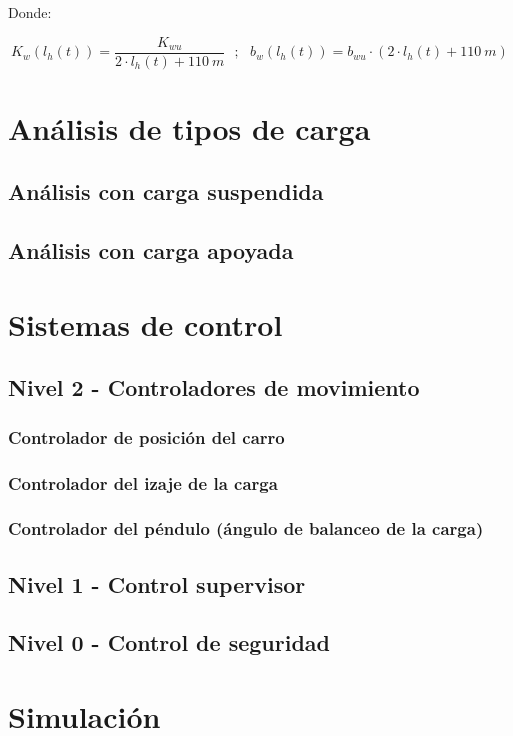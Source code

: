 \documentclass[11pt]{article}
\begin{document}
Donde:

\begin{equation}
	\label{eq:sistema_izaje_fuerza_cable_params}
	K_{w}\left ( l_{h}(t) \right )=\frac{K_{wu}}{2\cdot l_{h}(t)+110\ m}\ \ \ ;\ \ \ b_{w}\left ( l_{h}(t) \right )=b_{wu}\cdot \left ( 2\cdot l_{h}(t)+110\ m \right )
\end{equation}

\section{Análisis de tipos de carga}
\subsection{Análisis con carga suspendida}
\subsection{Análisis con carga apoyada}

\section{Sistemas de control}
\subsection{Nivel 2 - Controladores de movimiento}
\subsubsection{Controlador de posición del carro}
\subsubsection{Controlador del izaje de la carga}
\subsubsection{Controlador del péndulo (ángulo de balanceo de la carga)}
\subsection{Nivel 1 - Control supervisor}
\subsection{Nivel 0 - Control de seguridad}

\section{Simulación}
\end{document}
